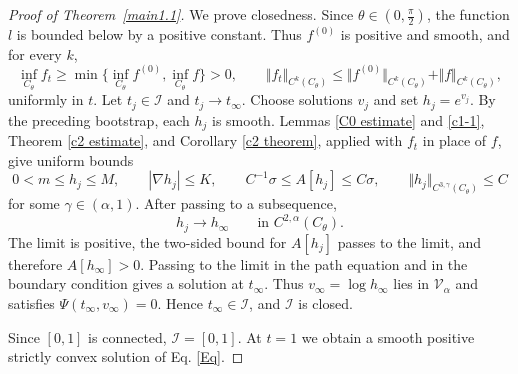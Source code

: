 \documentclass[11pt]{amsart}
\numberwithin{equation} {section}
\numberwithin{equation}{section}
\begin{document}
\begin{proof}[Proof of Theorem~\ref{main1.1}]
We prove closedness. Since $\theta\in(0,\frac{\pi}{2})$, the function $l$ is
bounded below by a positive constant. Thus $f^{(0)}$ is positive and smooth, and
for every $k$,
\[
        \inf_{C_{\theta}}f_t
        \geq \min\{\inf_{C_{\theta}}f^{(0)},\inf_{C_{\theta}}f\}>0,
        \qquad
        \Vert f_t\Vert_{C^k(C_{\theta})}
        \leq \Vert f^{(0)}\Vert_{C^k(C_{\theta})}
        +\Vert f\Vert_{C^k(C_{\theta})},
\]
uniformly in $t$. Let $t_j\in\mathcal I$ and $t_j\to t_{\infty}$. Choose
solutions $v_j$ and set $h_j=e^{v_j}$. By the preceding bootstrap, each $h_j$ is
smooth. Lemmas \ref{C0 estimate} and \ref{c1-1}, Theorem \ref{c2 estimate}, and
Corollary \ref{c2 theorem}, applied with $f_t$ in place of $f$, give uniform bounds
\[
        0<m\leq h_j\leq M,\qquad
        |\nabla h_j|\leq K,\qquad
        C^{-1}\sigma\leq A[h_j]\leq C\sigma,
        \qquad
        \Vert h_j\Vert_{C^{3,\gamma}(C_{\theta})}\leq C
\]
for some $\gamma\in(\alpha,1)$. After passing to a subsequence,
\[
        h_j\to h_{\infty}\qquad\text{in }C^{2,\alpha}(C_{\theta}).
\]
The limit is positive, the two-sided bound for $A[h_j]$ passes to the limit, and
therefore $A[h_{\infty}]>0$. Passing to the limit in the path equation and in
the boundary condition gives a solution at $t_{\infty}$. Thus
$v_{\infty}=\log h_{\infty}$ lies in $\mathcal V_{\alpha}$ and satisfies
$\Psi(t_{\infty},v_{\infty})=0$. Hence $t_{\infty}\in\mathcal I$, and
$\mathcal I$ is closed.

Since $[0,1]$ is connected, $\mathcal I=[0,1]$. At $t=1$ we obtain a smooth
positive strictly convex solution of Eq. \eqref{Eq}.


\end{proof}
\end{document}
